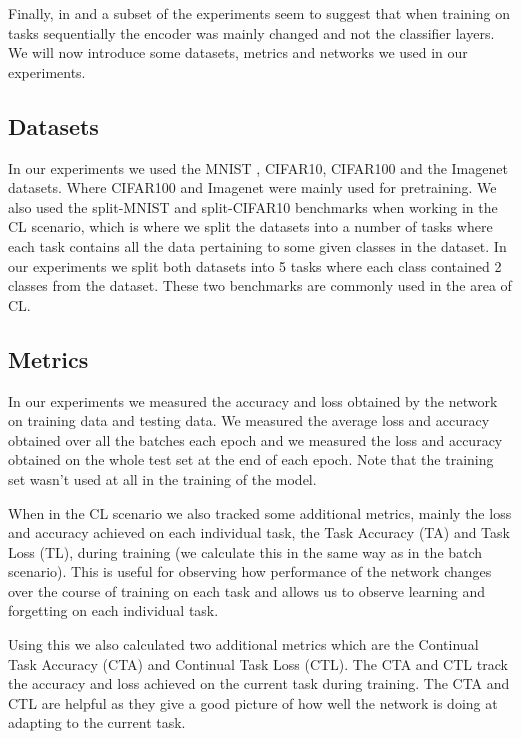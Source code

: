 Finally, in \cite{rebuffi2017icarl} and \cite{li2017learning} a subset of the experiments seem to suggest that when training on tasks sequentially the encoder was mainly changed and not the classifier layers. We will now introduce some datasets, metrics and networks we used in our experiments.

\subsection{Datasets}
\label{subsec:datasets}
In our experiments we used the MNIST \cite{deng2012mnist}, CIFAR10, CIFAR100 \cite{krizhevsky2009learning} and the Imagenet \cite{deng2009imagenet} datasets. Where CIFAR100 and Imagenet were mainly used for pretraining. We also used the split-MNIST \cite{zenke2017reg} and split-CIFAR10 \cite{zenke2017reg} benchmarks when working in the CL scenario, which is where we split the datasets into a number of tasks where each task contains all the data pertaining to some given classes in the dataset. In our experiments we split both datasets into 5 tasks where each class contained 2 classes from the dataset. These two benchmarks are commonly used in the area of CL. 

\subsection{Metrics}
\label{subsec:metrics}
In our experiments we measured the accuracy and loss obtained by the network on training data and testing data. We measured the average loss and accuracy obtained over all the batches each epoch and we measured the loss and accuracy obtained on the whole test set at the end of each epoch. Note that the training set wasn't used at all in the training of the model. 

When in the CL scenario we also tracked some additional metrics, mainly the loss and accuracy achieved on each individual task, the Task Accuracy (TA) and Task Loss (TL), during training (we calculate this in the same way as in the batch scenario). This is useful for observing how performance of the network changes over the course of training on each task and allows us to observe learning and forgetting on each individual task. 

Using this we also calculated two additional metrics which are the Continual Task Accuracy (CTA) and Continual Task Loss (CTL). The CTA and CTL track the accuracy and loss achieved on the current task during training. The CTA and CTL are helpful as they give a good picture of how well the network is doing at adapting to the current task. 

